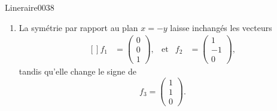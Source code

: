 \begin{corrige}{Lineraire0038}
\begin{enumerate}
	\item
		La symétrie par rapport au plan $x=-y$ laisse inchangés les vecteurs
		\begin{equation}
			\begin{aligned}[]
			f_1&=\begin{pmatrix}
				0	\\ 
				0	\\ 
				1	
			\end{pmatrix},&\text{et}&f_2&=\begin{pmatrix}
				1	\\ 
				-1	\\ 
				0	
			\end{pmatrix},
			\end{aligned}
		\end{equation}
		tandis qu'elle change le signe de
		\begin{equation}
			f_3=\begin{pmatrix}
				1	\\ 
				1	\\ 
				0	
			\end{pmatrix}.
		\end{equation}
		

\end{enumerate}
\end{corrige}
